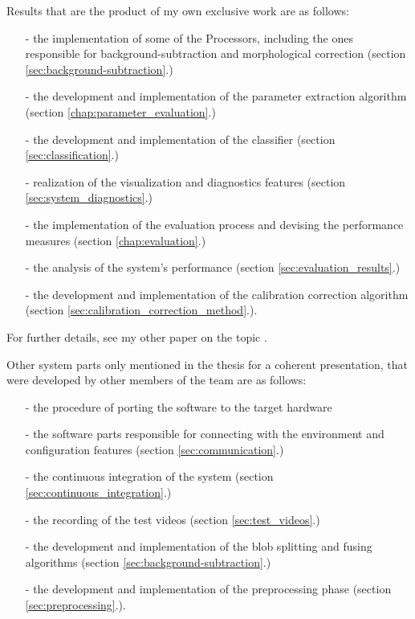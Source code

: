 \noindent Results that are the product of my own exclusive work are as follows:
\begin{itemize}
	\item[-] the implementation of some of the Processors, including the ones responsible for background-subtraction and morphological correction (section \ref{sec:background-subtraction}.)
	\item[-] the development and implementation of the parameter extraction algorithm (section \ref{chap:parameter_evaluation}.)
	\item[-] the development and implementation of the classifier (section \ref{sec:classification}.)
	\item[-] realization of the visualization and diagnostics features (section \ref{sec:system_diagnostics}.)
	\item[-] the implementation of the evaluation process and devising the performance measures (section \ref{chap:evaluation}.)
	\item[-] the analysis of the system's performance (section \ref{sec:evaluation_results}.)
	\item[-] the development and implementation of the calibration correction algorithm (section \ref{sec:calibration_correction_method}.).
\end{itemize}
For further details, see my other paper on the topic \cite{Barancsuk2016}.

\noindent Other system parts only mentioned in the thesis for a coherent presentation, that were developed by other members of the team are as follows:
\begin{itemize}
	\item[-] the procedure of porting the software to the target hardware
	\item[-] the software parts responsible for connecting with the environment and configuration features (section \ref{sec:communication}.)
	\item[-] the continuous integration of the system (section \ref{sec:continuous_integration}.)
	\item[-] the recording of the test videos (section \ref{sec:test_videos}.)
	\item[-] the development and implementation of the blob splitting and fusing algorithms (section \ref{sec:background-subtraction}.)
	\item[-] the development and implementation of the preprocessing phase (section \ref{sec:preprocessing}.).
\end{itemize}

